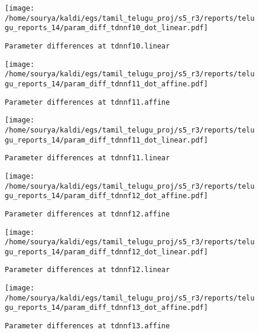\documentclass[prl,10pt,twocolumn]{revtex4}
\begin{document}
\newpage
\begin{figure}[h]
  \begin{center}
    \caption{\texttt{Parameter differences at tdnnf10.linear}}
    \texttt{[image: /home/sourya/kaldi/egs/tamil\_telugu\_proj/s5\_r3/reports/telugu\_reports\_14/param\_diff\_tdnnf10\_dot\_linear.pdf]}
  \end{center}
\end{figure}
\clearpage


\newpage
\begin{figure}[h]
  \begin{center}
    \caption{\texttt{Parameter differences at tdnnf11.affine}}
    \texttt{[image: /home/sourya/kaldi/egs/tamil\_telugu\_proj/s5\_r3/reports/telugu\_reports\_14/param\_diff\_tdnnf11\_dot\_affine.pdf]}
  \end{center}
\end{figure}
\clearpage


\newpage
\begin{figure}[h]
  \begin{center}
    \caption{\texttt{Parameter differences at tdnnf11.linear}}
    \texttt{[image: /home/sourya/kaldi/egs/tamil\_telugu\_proj/s5\_r3/reports/telugu\_reports\_14/param\_diff\_tdnnf11\_dot\_linear.pdf]}
  \end{center}
\end{figure}
\clearpage


\newpage
\begin{figure}[h]
  \begin{center}
    \caption{\texttt{Parameter differences at tdnnf12.affine}}
    \texttt{[image: /home/sourya/kaldi/egs/tamil\_telugu\_proj/s5\_r3/reports/telugu\_reports\_14/param\_diff\_tdnnf12\_dot\_affine.pdf]}
  \end{center}
\end{figure}
\clearpage


\newpage
\begin{figure}[h]
  \begin{center}
    \caption{\texttt{Parameter differences at tdnnf12.linear}}
    \texttt{[image: /home/sourya/kaldi/egs/tamil\_telugu\_proj/s5\_r3/reports/telugu\_reports\_14/param\_diff\_tdnnf12\_dot\_linear.pdf]}
  \end{center}
\end{figure}
\clearpage


\newpage
\begin{figure}[h]
  \begin{center}
    \caption{\texttt{Parameter differences at tdnnf13.affine}}
    \texttt{[image: /home/sourya/kaldi/egs/tamil\_telugu\_proj/s5\_r3/reports/telugu\_reports\_14/param\_diff\_tdnnf13\_dot\_affine.pdf]}
  \end{center}
\end{figure}
\clearpage
\end{document}
